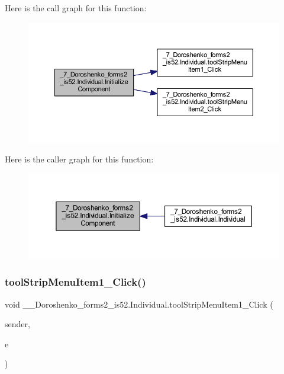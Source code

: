 Here is the call graph for this function\+:
\nopagebreak
\begin{figure}[H]
\begin{center}
\leavevmode
\includegraphics[width=350pt]{class__7___doroshenko__forms2__is52_1_1_individual_aa5f3989e9a76bfe28e9848301f701e6a_cgraph}
\end{center}
\end{figure}
Here is the caller graph for this function\+:
\nopagebreak
\begin{figure}[H]
\begin{center}
\leavevmode
\includegraphics[width=350pt]{class__7___doroshenko__forms2__is52_1_1_individual_aa5f3989e9a76bfe28e9848301f701e6a_icgraph}
\end{center}
\end{figure}
\hypertarget{class__7___doroshenko__forms2__is52_1_1_individual_a1457fce6b1dde96e8f73fb4b60f50793}{}\label{class__7___doroshenko__forms2__is52_1_1_individual_a1457fce6b1dde96e8f73fb4b60f50793} 
\subsubsection{\texorpdfstring{tool\+Strip\+Menu\+Item1\+\_\+\+Click()}{toolStripMenuItem1\_Click()}}
{\footnotesize\ttfamily void \+\_\+\_\+\+Doroshenko\+\_\+forms2\+\_\+is52.\+Individual.\+tool\+Strip\+Menu\+Item1\+\_\+\+Click (\begin{DoxyParamCaption}\item[{object}]{sender,  }\item[{Event\+Args}]{e }\end{DoxyParamCaption})\hspace{0.3cm}{\ttfamily [private]}}

